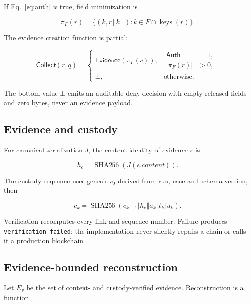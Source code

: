 ﻿\documentclass[10pt,a4paper,twocolumn]{article}
\newcommand{\code}[1]{\texttt{#1}}
\begin{document}
If Eq.~\eqref{eq:auth} is true, field minimization is

\begin{equation}
\pi_F(r)=\{(k,r[k]):k\in F\cap\operatorname{keys}(r)\}.
\end{equation}

The evidence creation function is partial:

\begin{equation}
\mathsf{Collect}(r,q)=
\begin{cases}
\mathsf{Evidence}(\pi_F(r)),&
\begin{aligned}\mathsf{Auth}&=1,\\[-2pt]|\pi_F(r)|&>0,
\end{aligned}\\
\bot,&\text{otherwise}.
\end{cases}
\label{eq:collect}
\end{equation}

The bottom value \(\bot\) emits an auditable deny decision with empty released fields and zero bytes, never an evidence payload.

\subsection{Evidence and custody}

For canonical serialization \(J\), the content identity of evidence \(e\) is

\begin{equation}
h_e=\operatorname{SHA256}(J(e.content)).
\end{equation}

The custody sequence uses genesis \(c_0\) derived from run, case and schema version, then

\begin{equation}
c_k=\operatorname{SHA256}(c_{k-1}\Vert h_e\Vert a_k\Vert t_k\Vert u_k).
\label{eq:custody}
\end{equation}

Verification recomputes every link and sequence number. Failure produces \code{verification\_failed}; the implementation never silently repairs a chain or calls it a production blockchain.

\subsection{Evidence-bounded reconstruction}

Let \(E_v\) be the set of content- and custody-verified evidence. Reconstruction is a function
\end{document}
